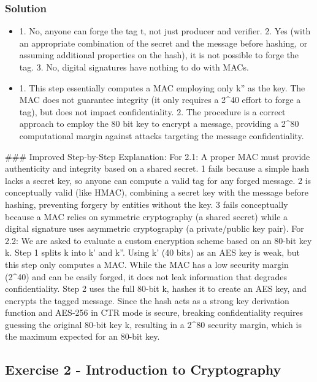 \documentclass{article}
\begin{document}
\subsubsection*{Solution}
\begin{itemize}
    \item[\textbf{2.1}] 1. No, anyone can forge the tag t, not just producer and verifier. 2. Yes (with an appropriate combination of the secret and the message before hashing, or assuming additional properties on the hash), it is not possible to forge the tag. 3. No, digital signatures have nothing to do with MACs.

    \item[\textbf{2.2}] 1. This step essentially computes a MAC employing only k'' as the key. The MAC does not guarantee integrity (it only requires a 2\textasciicircum{}40 effort to forge a tag), but does not impact confidentiality. 2. The procedure is a correct approach to employ the 80 bit key to encrypt a message, providing a 2\textasciicircum{}80 computational margin against attacks targeting the message confidentiality.

\end{itemize}
\#\#\# Improved Step-by-Step Explanation:
For 2.1: A proper MAC must provide authenticity and integrity based on a shared secret. 1 fails because a simple hash lacks a secret key, so anyone can compute a valid tag for any forged message. 2 is conceptually valid (like HMAC), combining a secret key with the message before hashing, preventing forgery by entities without the key. 3 fails conceptually because a MAC relies on symmetric cryptography (a shared secret) while a digital signature uses asymmetric cryptography (a private/public key pair).
For 2.2: We are asked to evaluate a custom encryption scheme based on an 80-bit key k. Step 1 splits k into k' and k''. Using k' (40 bits) as an AES key is weak, but this step only computes a MAC. While the MAC has a low security margin (2\textasciicircum{}40) and can be easily forged, it does not leak information that degrades confidentiality. Step 2 uses the full 80-bit k, hashes it to create an AES key, and encrypts the tagged message. Since the hash acts as a strong key derivation function and AES-256 in CTR mode is secure, breaking confidentiality requires guessing the original 80-bit key k, resulting in a 2\textasciicircum{}80 security margin, which is the maximum expected for an 80-bit key.

\subsection{Exercise 2 - Introduction to Cryptography}
\end{document}
